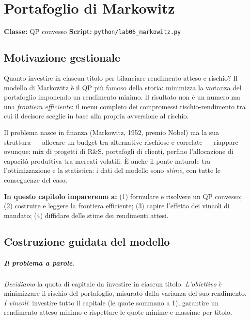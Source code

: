 \chapter{Portafoglio di Markowitz}
\label{cap:markowitz}

\noindent\textbf{Classe:} QP convesso \hfill
\textbf{Script:} \texttt{python/lab06\_markowitz.py}

\section{Motivazione gestionale}

Quanto investire in ciascun titolo per bilanciare rendimento atteso e rischio? Il
modello di Markowitz è il QP più famoso della storia: minimizza la varianza del
portafoglio imponendo un rendimento minimo. Il risultato non è un numero ma una
\emph{frontiera efficiente}: il menu completo dei compromessi rischio-rendimento tra
cui il decisore sceglie in base alla propria avversione al rischio.



Il problema nasce in finanza (Markowitz, 1952, premio Nobel) ma la sua struttura
--- allocare un budget tra alternative rischiose e correlate --- riappare ovunque:
mix di progetti di R\&S, portafogli di clienti, perfino l'allocazione di capacità
produttiva tra mercati volatili. È anche il ponte naturale tra l'ottimizzazione e
la statistica: i dati del modello sono \emph{stime}, con tutte le conseguenze del
caso.

\textbf{In questo capitolo impareremo a:} (1) formulare e risolvere un QP convesso;
(2) costruire e leggere la frontiera efficiente; (3) capire l'effetto dei vincoli
di mandato; (4) diffidare delle stime dei rendimenti attesi.

\section{Costruzione guidata del modello}

\paragraph{Il problema a parole.} \emph{Decidiamo} la quota di capitale da investire
in ciascun titolo. \emph{L'obiettivo} è minimizzare il rischio del portafoglio,
misurato dalla varianza del suo rendimento. \emph{I vincoli}: investire tutto il
capitale (le quote sommano a 1), garantire un rendimento atteso minimo e rispettare
le quote minime e massime per titolo.

